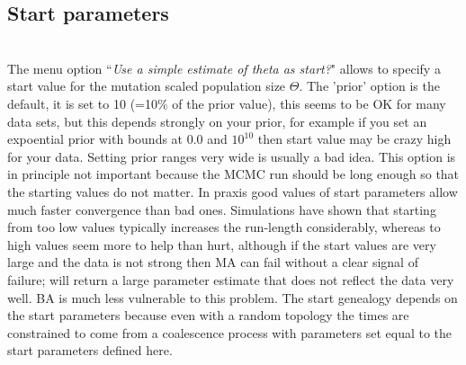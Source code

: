 \subsection*{Start parameters}
\begin{description}
\item{}\\
The menu option ``\textsl{Use a simple estimate of theta as start?}" allows to specify a start value for the mutation scaled population size $\Theta$. 
The 'prior' option is the default, it is set to 10 (=10\% of the prior value), this seems to be OK for many data sets, but this depends strongly on your prior, for example if you set an expoential prior with bounds at $0.0$ and $10^10$ then start value may be crazy high for your data. Setting prior ranges very wide is usually a bad idea.
This option is in principle not important because the MCMC run should be long enough so that the starting values do not matter. In praxis good values of start parameters allow much faster  convergence than bad ones. Simulations have shown that starting from too low values typically increases the run-length considerably, whereas to high values seem more to help than hurt, although if the start values are very large and the data is not strong then MA  can fail without a clear signal of failure; \migrate will return a large parameter estimate that does not reflect the data very well. BA is much less vulnerable to this problem. The start genealogy depends on the start parameters because even with a random topology the times are constrained to come from a coalescence process with parameters set equal to the start parameters defined here.


\end{description}
